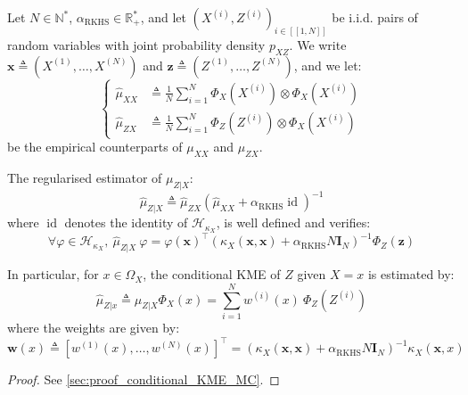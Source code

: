 \begin{proposition}\label{th:conditional_KME_MC}
	Let $N\in\mathbb{N}^*$, $\alpha_{\mathrm{RKHS}}\in\mathbb{R}_+^*$, and let $\left(X^{(i)},Z^{(i)}\right)_{i\in[\![1,N]\!]}$ be i.i.d. pairs of random variables with joint probability density $p_{XZ}$. We write $\mathbf{x}\triangleq\left(X^{(1)},\dots,X^{(N)}\right)$ and $\mathbf{z}\triangleq\left(Z^{(1)},\dots,Z^{(N)}\right)$, and we let:
	\begin{equation}
		\left\{\begin{aligned}
		\hat{\mu}_{XX}&\triangleq\frac{1}{N}\sum_{i=1}^N\Phi_X\left(X^{(i)}\right)\otimes\Phi_X\left(X^{(i)}\right)\\
		\hat{\mu}_{ZX}&\triangleq\frac{1}{N}\sum_{i=1}^N\Phi_Z\left(Z^{(i)}\right)\otimes\Phi_X\left(X^{(i)}\right)
		\end{aligned}\right.
	\end{equation}
	be the empirical counterparts of $\mu_{XX}$ and $\mu_{ZX}$.

	The regularised estimator of $\mu_{Z|X}$:
	\begin{equation}
		\hat{\mu}_{Z|X}\triangleq\hat{\mu}_{ZX}\left(\hat{\mu}_{XX}+\alpha_{\mathrm{RKHS}} \operatorname{id}\right)^{-1}
	\end{equation}
	where $\operatorname{id}$ denotes the identity of $\mathcal{H}_{\kappa_X}$, is well defined and verifies:
	\begin{equation}
		\forall\varphi\in\mathcal{H}_{\kappa_X},\:\hat{\mu}_{Z|X}\:\varphi=\varphi(\mathbf{x})^\top\left(\kappa_X(\mathbf{x},\mathbf{x})+\alpha_{\mathrm{RKHS}} N\mathbf{I}_N\right)^{-1}\Phi_Z(\mathbf{z})
	\end{equation}

	In particular, for $x\in\Omega_X$, the conditional KME of $Z$ given $X=x$ is estimated by:
	\begin{equation}
		\hat{\mu}_{Z|x}\triangleq\hat{\mu}_{Z|X}\Phi_X(x)=\sum_{i=1}^Nw^{(i)}(x)\:\Phi_Z\left(Z^{(i)}\right)
	\end{equation}
	where the weights are given by:
	\begin{equation}
		\mathbf{w}(x)\triangleq\left[w^{(1)}(x),\dots,w^{(N)}(x)\right]^\top=\left(\kappa_X(\mathbf{x},\mathbf{x})+\alpha_{\mathrm{RKHS}} N\mathbf{I}_N\right)^{-1}\kappa_X(\mathbf{x},x)
	\end{equation}
\end{proposition}

\begin{proof}
	See \cref{sec:proof_conditional_KME_MC}.
\end{proof}

